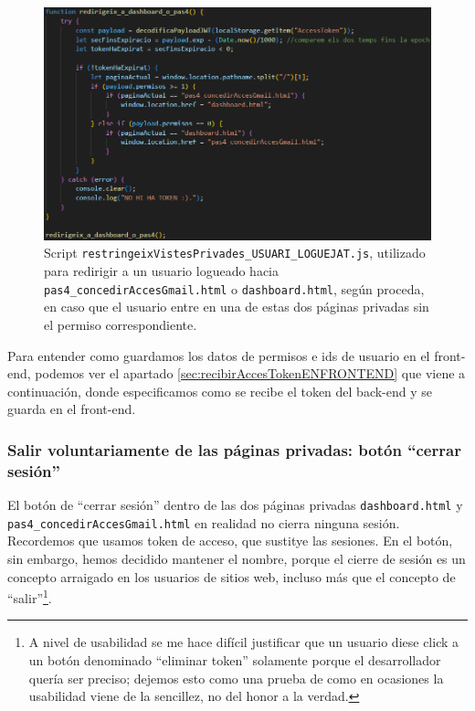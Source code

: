 \documentclass[a4paper,12pt]{report}
\begin{document}
	
	\setlength{\abovecaptionskip}{15pt}
	\FloatBarrier
	\begin{figure}[H]
		\centering
		\caption{Script \texttt{restringeixVistesPrivades\_USUARI\_LOGUEJAT.js}, utilizado para redirigir a un usuario logueado hacia \texttt{pas4\_concedirAccesGmail.html} o \texttt{dashboard.html}, según proceda, en caso que el usuario entre en una de estas dos páginas privadas sin el permiso correspondiente.}
		\includegraphics[width=1\linewidth]{img/restringeixVistesPrivadesUSUARINOLOGUEJAT.png}
		
		\label{fig:restringeixVistesPrivadesUSUARINOLOGUEJAT}
	\end{figure}
	\FloatBarrier	
	
	
	
	Para entender como guardamos los datos de permisos e ids de usuario en el front-end, podemos ver el apartado \ref{sec:recibirAccesTokenENFRONTEND} que viene a continuación, donde especificamos como se recibe el token del back-end y se guarda en el front-end.
	
	\subsubsection{Salir voluntariamente de las páginas privadas: botón ``cerrar sesión''}
	
	El botón de ``cerrar sesión'' dentro de las dos páginas privadas \texttt{dashboard.html} y \texttt{pas4\_concedirAccesGmail.html} en realidad no cierra ninguna sesión. Recordemos que usamos token de acceso, que sustitye las sesiones. En el botón, sin embargo, hemos decidido mantener el nombre, porque el cierre de sesión es un concepto arraigado en los usuarios de sitios web, incluso más que el concepto de ``salir''\footnote{A nivel de usabilidad se me hace difícil justificar que un usuario diese click a un botón denominado ``eliminar token'' solamente porque el desarrollador quería ser preciso; dejemos esto como una prueba de como en ocasiones la usabilidad viene de la sencillez, no del honor a la verdad.}. 
	
\end{document}
